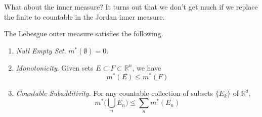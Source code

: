   What about the inner measure? It turns out that we don't get much if we replace the finite to countable in the Jordan inner measure. 

  \begin{lemma}
    The Lebesgue outer measure satisfies the following. 
    \begin{enumerate}
      \item \textit{Null Empty Set}. $m^\ast(\emptyset) = 0$. 
      \item \textit{Monotonicity}. Given sets $E \subset F \subset \mathbb{R}^n$, we have 
      \begin{equation}
        m^\ast (E) \leq m^\ast (F)
      \end{equation}
    \item \textit{Countable Subadditivity}. For any countable collection of subsets $\{E_k\}$ of $\mathbb{R}^d$, 
      \begin{equation}
        m^\ast \bigg( \bigcup_n E_n \bigg) \leq \sum_{n} m^\ast (E_n) 
      \end{equation}
    \end{enumerate}
  \end{lemma}
